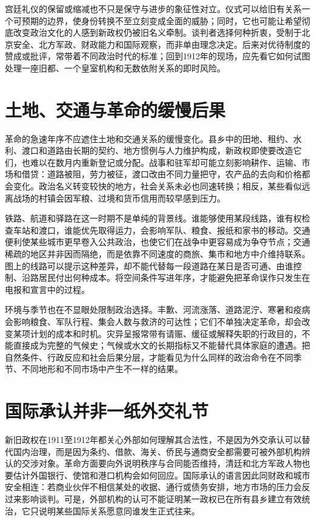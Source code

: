 宫廷礼仪的保留或缩减也不只是保守与进步的象征性对立。仪式可以给旧有关系一个可预期的边界，使身份转换不至立刻变成全面的威胁；同时，它也可能让希望彻底改变政治文化的人感到新政权仍被旧名义牵制。谈判者选择何种折衷，受制于北京安全、北方军政、财政能力和国际观察，而非单由理念决定。后来对优待制度的赞成或批评，常带着不同政治时代的标准；回到1912年的现场，应先看它如何试图处理一座旧都、一个皇室机构和无数依附关系的即时风险。

\section{土地、交通与革命的缓慢后果}

革命的急速年序不应遮住土地和交通关系的缓慢变化。县乡中的田地、租约、水利、渡口和道路由长期的契约、地方惯例与人力维护构成，新政权即使要改造它们，也难以在数月内重新登记或分配。战事和驻军却可能立刻影响耕作、运输、市场和借贷：道路被阻，劳力被征，渡口改由不同力量把守，农产品的去向和价格都会变化。政治名义转变较快的地方，社会关系未必也同速转换；相反，某些看似远离战场的村镇会因军粮、过境和货币信用而较早感到压力。

铁路、航道和驿路在这一时期不是单纯的背景线。谁能够使用某段线路，谁有权检查车站和渡口，谁能优先取得运力，会影响军队、粮食、报纸和家书的移动。交通便利使某些城市更早卷入公共政治，也使它们在战争中更容易成为争夺节点；交通稀疏的地区并非因而隔绝，而是依靠不同速度的商旅、集市和地方中介维持联系。图上的线路可以提示这种差异，却不能代替每一段道路在某日是否可通、由谁控制、沿路居民付出何种成本。将空间条件写进年序，才能避免把革命误作只发生在电报和宣言中的过程。

环境与季节也在不显眼处限制政治选择。丰歉、河流涨落、道路泥泞、寒暑和疫病会影响粮食、军队行程、集会人数与救济的可达性；它们不单独决定革命，却会改变某项计划的成本和时机。灾异呈报常带有请赈、缓征或解释失职的行政目的，不能直接成为完整的气候史；气候或水文的长期指标又不能替代具体家庭的遭遇。把自然条件、行政反应和社会后果分层，才能看见为什么同样的政治命令在不同季节、不同地形和不同市场中产生不一样的结果。

\section{国际承认并非一纸外交礼节}

新旧政权在1911至1912年都关心外部如何理解其合法性，不是因为外交承认可以替代国内治理，而是因为条约、借款、海关、侨民与通商安全都需要可被外部机构辨认的交涉对象。革命方面要向外说明秩序与合同能否维持，清廷和北方军政人物也要估计外国银行、使馆和港口机构会如何回应。国际承认的语言因此同财政和城市安全相连：若商业伙伴不相信某处的收据、通行或债务安排，地方市场的压力会反过来影响谈判。可是，外部机构的认可不能证明某一政权已在所有县乡建立有效统治，它只说明某些国际关系愿意同谁发生正式往来。

